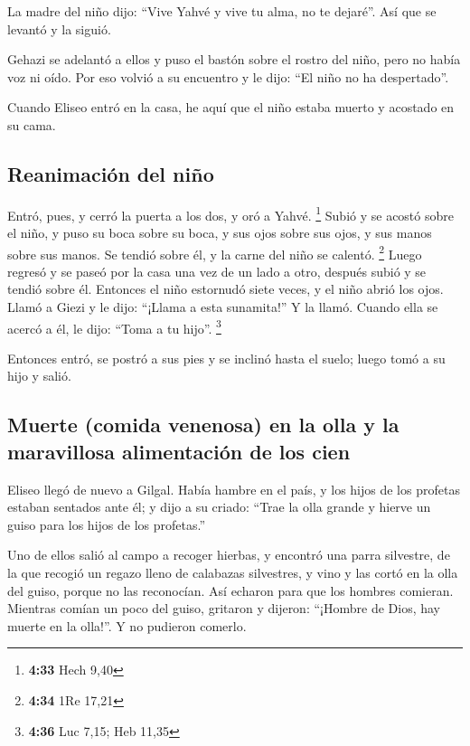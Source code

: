 \begin{paracol}{2}
 La madre del niño dijo: ``Vive Yahvé y vive tu alma, no
te dejaré''. Así que se levantó y la siguió.

 Gehazi se adelantó a ellos y puso el bastón sobre el
rostro del niño, pero no había voz ni oído. Por eso volvió a su
encuentro y le dijo: ``El niño no ha despertado''.

 Cuando Eliseo entró en la casa, he aquí que el niño
estaba muerto y acostado en su cama.

\hypertarget{reanimaciuxf3n-del-niuxf1o}{%
\subsection{Reanimación del niño}\label{reanimaciuxf3n-del-niuxf1o}}

 Entró, pues, y cerró la puerta a los dos, y oró a Yahvé.
\footnote{\textbf{4:33} Hech 9,40}  Subió y se acostó
sobre el niño, y puso su boca sobre su boca, y sus ojos sobre sus ojos,
y sus manos sobre sus manos. Se tendió sobre él, y la carne del niño se
calentó. \footnote{\textbf{4:34} 1Re 17,21}  Luego
regresó y se paseó por la casa una vez de un lado a otro, después subió
y se tendió sobre él. Entonces el niño estornudó siete veces, y el niño
abrió los ojos.  Llamó a Giezi y le dijo: ``¡Llama a esta
sunamita!'' Y la llamó. Cuando ella se acercó a él, le dijo: ``Toma a tu
hijo''. \footnote{\textbf{4:36} Luc 7,15; Heb 11,35}

 Entonces entró, se postró a sus pies y se inclinó hasta
el suelo; luego tomó a su hijo y salió.

\hypertarget{muerte-comida-venenosa-en-la-olla-y-la-maravillosa-alimentaciuxf3n-de-los-cien}{%
\subsection{Muerte (comida venenosa) en la olla y la maravillosa
alimentación de los
cien}\label{muerte-comida-venenosa-en-la-olla-y-la-maravillosa-alimentaciuxf3n-de-los-cien}}

 Eliseo llegó de nuevo a Gilgal. Había hambre en el país,
y los hijos de los profetas estaban sentados ante él; y dijo a su
criado: ``Trae la olla grande y hierve un guiso para los hijos de los
profetas.''

 Uno de ellos salió al campo a recoger hierbas, y
encontró una parra silvestre, de la que recogió un regazo lleno de
calabazas silvestres, y vino y las cortó en la olla del guiso, porque no
las reconocían.  Así echaron para que los hombres
comieran. Mientras comían un poco del guiso, gritaron y dijeron:
``¡Hombre de Dios, hay muerte en la olla!''. Y no pudieron comerlo.


\end{paracol}
